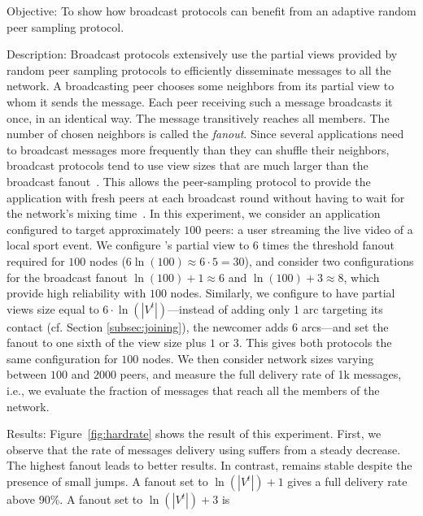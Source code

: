 \begin{asparadesc}
\item [Objective:] To show how broadcast protocols can benefit from
  an adaptive random peer sampling protocol.
\item [Description:] Broadcast protocols extensively use the partial
  views provided by random peer sampling protocols to efficiently
  disseminate messages to all the network. A broadcasting peer chooses
  some neighbors from its partial view to whom it sends the
  message. Each peer receiving such a message broadcasts it once, in
  an identical way. The message transitively reaches all members. The
  number of chosen neighbors is called the \emph{fanout}. Since
  several applications need to broadcast messages more frequently than
  they can shuffle their neighbors, broadcast protocols tend to use
  view sizes that are much larger than the broadcast
  fanout~\cite{Frey09Middleware}. This allows the peer-sampling
  protocol to provide the application with fresh peers at each
  broadcast round without having to wait for the network's mixing
  time~\cite{jelasity2007gossip}. In this experiment, we consider an
  application configured to target approximately $100$ peers: a user
  streaming the live video of a local sport event. We configure
  \CYCLON's partial view to $6$ times the threshold fanout required
  for $100$ nodes ($6 \ln(100) \approx 6 \cdot 5 = 30$), and consider
  two configurations for the broadcast fanout $\ln(100)+1 \approx 6 $
  and $\ln(100)+3 \approx 8$, which provide high reliability with
  $100$ nodes. Similarly, we configure \SPRAY to have partial views
  size equal to $6 \cdot \ln(|V^t|)$---instead of adding only 1 arc
  targeting its contact (cf. Section \ref{subsec:joining}), the
  newcomer adds 6 arcs---and set the fanout to one sixth of the view
  size plus $1$ or $3$. This gives both protocols the same
  configuration for $100$ nodes.  We then consider network sizes
  varying between $100$ and $2000$ peers, and measure the full
  delivery rate of 1k messages, i.e., we evaluate the fraction of
  messages that reach all the members of the network.
\item [Results:] Figure~\ref{fig:hardrate} shows the result of this
  experiment. First, we observe that the rate of messages delivery
  using \CYCLON suffers from a steady decrease. The highest fanout
  leads to better results. In contrast, \SPRAY remains stable despite
  the presence of small jumps. A fanout set to $\ln(|V^t|)+1$ gives a
  full delivery rate above 90\%. A fanout set to $\ln(|V^t|)+3$ is

\end{asparadesc}
